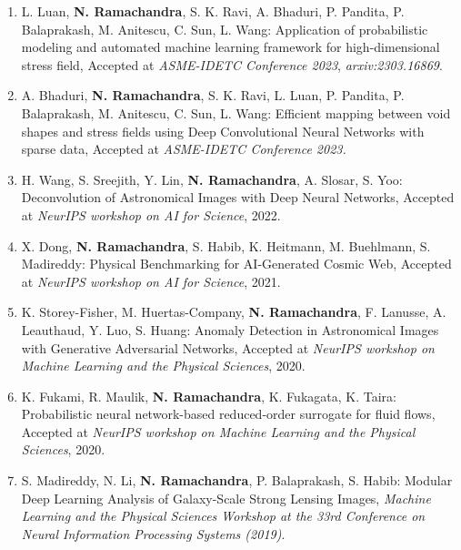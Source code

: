 \documentclass[letterpaper]{article}
\begin{document}
\begin{enumerate}
\item L. Luan, \textbf{N. Ramachandra}, S. K. Ravi, A. Bhaduri, P. Pandita, P. Balaprakash, M. Anitescu, C. Sun, L. Wang: Application of probabilistic modeling and automated machine learning framework for high-dimensional stress field, Accepted at {\it ASME-IDETC Conference 2023}, {\it arxiv:2303.16869}.


\item A. Bhaduri, \textbf{N. Ramachandra}, S. K. Ravi, L. Luan, P. Pandita, P. Balaprakash, M. Anitescu, C. Sun, L. Wang: Efficient mapping between void shapes and stress fields using Deep Convolutional Neural Networks with sparse data, Accepted at {\it ASME-IDETC Conference 2023.}

\item H. Wang, S. Sreejith, Y. Lin, \textbf{N. Ramachandra}, A. Slosar, S. Yoo: Deconvolution of Astronomical Images with Deep Neural Networks, Accepted at {\it NeurIPS workshop on AI for Science}, 2022.

\item X. Dong, \textbf{N. Ramachandra}, S. Habib, K. Heitmann, M. Buehlmann, S. Madireddy: Physical Benchmarking for AI-Generated Cosmic Web, Accepted at {\it NeurIPS workshop on AI for Science}, 2021.

\item K. Storey-Fisher, M. Huertas-Company, \textbf{N. Ramachandra}, F. Lanusse, A. Leauthaud, Y. Luo, S. Huang: Anomaly Detection in Astronomical Images with Generative Adversarial Networks, Accepted at {\it NeurIPS workshop on Machine Learning and the Physical Sciences}, 2020.

\item K. Fukami, R. Maulik, \textbf{N. Ramachandra}, K. Fukagata, K. Taira: Probabilistic neural network-based reduced-order surrogate for fluid flows, Accepted at {\it NeurIPS workshop on Machine Learning and the Physical Sciences}, 2020.

\item S. Madireddy, N. Li, \textbf{N. Ramachandra}, P. Balaprakash, S. Habib: Modular Deep Learning Analysis of Galaxy-Scale Strong Lensing Images, {\it Machine Learning and the Physical Sciences Workshop at the 33rd Conference on Neural Information Processing Systems (2019)}.

\end{enumerate}

\end{document}
